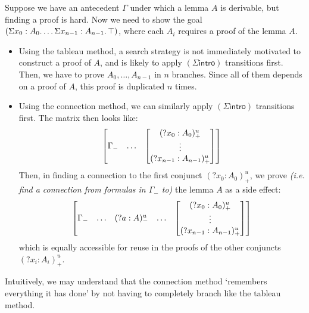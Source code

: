 \documentclass[twoside]{report}
\begin{document}
\begin{example}
    Suppose we have an antecedent $\Gamma$ under which a lemma $A$ is derivable, but finding a proof is hard. Now we need to show the goal $(\Sigma{x_0} : {A_0}.\,{\ldots \Sigma{x_{n-1}} : {A_{n-1}}.\,{\top}})$, where each $A_i$ requires a proof of the lemma $A$.

    \begin{itemize}
        \item Using the tableau method, a search strategy is not immediately motivated to construct a proof of $A$, and is likely to apply $(\Sigma\mathsf{intro})$ transitions first. Then, we have to prove $A_0, \ldots, A_{n-1}$ in $n$ branches. Since all of them depends on a proof of $A$, this proof is duplicated $n$ times.

        \item Using the connection method, we can similarly apply $(\Sigma\mathsf{intro})$ transitions first. The matrix then looks like:
              $$
                  \begin{bmatrix}\Gamma_- & \ldots & \begin{bmatrix}({?x_0} : A_0)^u_+ \\ \vdots \\ ({?x_{n-1}} : A_{n-1})^u_+\end{bmatrix}\end{bmatrix}
              $$
              Then, in finding a connection to the first conjunct $({?x_0} : A_0)^u_+$, we prove \emph{(i.e. find a connection from formulas in $\Gamma_-$ to)} the lemma $A$ as a side effect:
              $$
                  \begin{bmatrix}\Gamma_- & \ldots & ({?a} : A)^u_- & \ldots & \begin{bmatrix}({?x_0} : A_0)^u_+ \\ \vdots \\ ({?x_{n-1}} : A_{n-1})^u_+\end{bmatrix}\end{bmatrix}
              $$
              which is equally accessible for reuse in the proofs of the other conjuncts $({?x_i} : A_i)^u_+$.
    \end{itemize}

    Intuitively, we may understand that the connection method `remembers everything it has done' by not having to completely branch like the tableau method.
\end{example}
\end{document}
